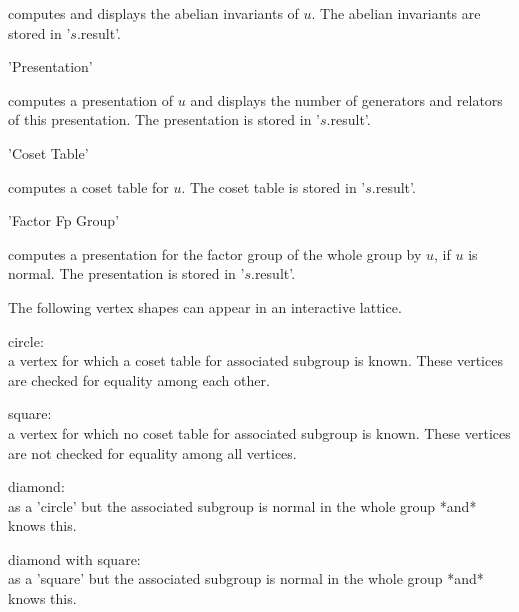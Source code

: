 computes  and  displays  the  abelian invariants  of  $u$.   The  abelian
invariants are stored in '$s$.result'.

'Presentation'

computes a presentation of $u$ and displays  the number of generators and
relators   of   this presentation.     The   presentation is    stored in
'$s$.result'.

'Coset Table'

computes   a   coset table for   $u$.    The  coset  table  is  stored in
'$s$.result'.

'Factor Fp Group'

computes a presentation  for the factor group  of the whole group by $u$,
if $u$ is normal.  The presentation is stored in '$s$.result'.


The following vertex shapes can appear in an interactive lattice.

circle:\\
    a vertex for which  a coset table for  associated subgroup is  known.
    These vertices are checked for equality among each other.

square:\\
    a vertex for which  no coset table for  associated subgroup is known.
    These vertices are not checked for equality among all vertices.

diamond:\\
    as  a 'circle' but   the associated subgroup  is  normal in the whole
    group *and* {\GAP} knows this.

diamond with square:\\
    as a  'square'  but the associated subgroup  is  normal in  the whole
    group *and* {\GAP} knows this.
